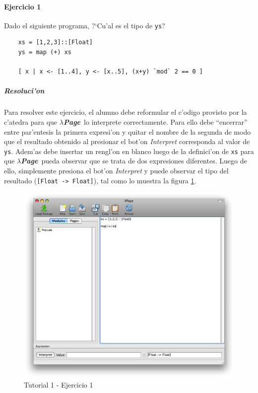 \documentclass[a4paper]{article}
\newcommand{\hpage}{\textbf{\textsl{$\lambda$Page}}}
\begin{document}
\paragraph{Ejercicio 1}Dado el siguiente programa, ?`Cu'al es el tipo de \texttt{ys}?
\lstset{language=haskell, frame=single, tabsize=4}
\begin{lstlisting}
	xs = [1,2,3]::[Float]
	ys = map (+) xs
	
	[ x | x <- [1..4], y <- [x..5], (x+y) `mod` 2 == 0 ]
\end{lstlisting}
\subparagraph{Resoluci'on}Para resolver este ejercicio, el alumno debe reformular el c'odigo provisto por la c'atedra para que \hpage\ lo interprete correctamente.  Para ello debe ``encerrar'' entre par'entesis la primera expresi'on y quitar el nombre de la segunda de modo que el resultado obtenido al presionar el bot'on \textsl{Interpret} corresponda al valor de \texttt{ys}.  Adem'as debe insertar un rengl'on en blanco luego de la definici'on de \texttt{xs} para que \hpage\ pueda observar que se trata de dos expresiones diferentes.  Luego de ello, simplemente presiona el bot'on \textsl{Interpret} y puede observar el tipo del resultado (\texttt{[Float -> Float]}), tal como lo muestra la figura \ref{tut101}.
\begin{figure}[hp]
	\begin{center}
        	\includegraphics[width=.9\textwidth]{pictures/tut1/01}
		\caption{Tutorial 1 - Ejercicio 1}
		\label{tut101}
	\end{center}
\end{figure}
\end{document}
